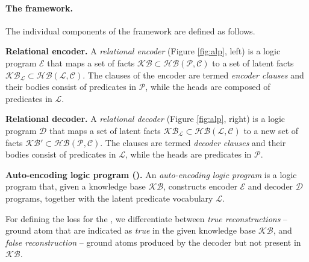 \paragraph{The framework.}
The individual components of the framework are defined as follows.



\begin{definition}
\textbf{Relational encoder.}
A \textit{relational encoder} (Figure \ref{fig:alp}, left) is a logic program $\mathcal{E}$ %
that maps a set of facts $\mathcal{KB} \subset \mathcal{HB(P,C)}$ to a set of latent facts $\mathcal{KB}_{\mathcal{L}} \subset \mathcal{HB(L,C)}$.
The clauses of the encoder are termed \textit{encoder clauses} and their bodies consist of predicates in $\mathcal{P}$, while the heads are composed of predicates in $\mathcal{L}$.
\end{definition}


\begin{definition}
\textbf{Relational decoder.}
A \textit{relational decoder} (Figure \ref{fig:alp}, right) is a logic program $\mathcal{D}$ %
that maps a set of latent facts $\mathcal{KB}_{\mathcal{L}} \subset \mathcal{HB(L,C)}$  to a new set of facts $\mathcal{KB}' \subset \mathcal{HB(P,C)}$.
The clauses are termed \textit{decoder clauses} and their bodies consist of predicates in $\mathcal{L}$, while the heads are predicates in $\mathcal{P}$.
\end{definition}



\begin{definition}
\textbf{Auto-encoding logic program (\alp{}).}
An \textit{auto-encoding logic program} is a logic program that, given a knowledge base $\mathcal{KB}$, constructs encoder $\mathcal{E}$ and decoder $\mathcal{D}$ programs, together with the latent predicate vocabulary $\mathcal{L}$.
\end{definition}


For defining the loss for the , we differentiate between \textit{true reconstructions} -- ground atom that are indicated as \textit{true} in the given knowledge base $\mathcal{KB}$, and \textit{false reconstruction} -- ground atoms produced by the decoder but not present in $\mathcal{KB}$.

